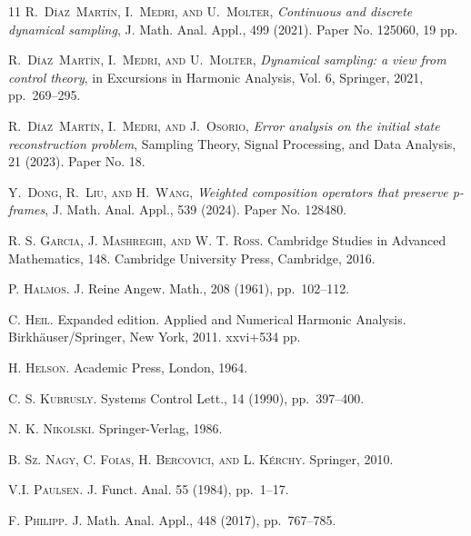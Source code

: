 \documentclass[a4paper,12pt]{amsart}
\theoremstyle{definition}
\begin{document}
\begin{thebibliography}{11}
\textsc{R.~D\'iaz~Mart\'{\i}n, I.~Medri, and U.~Molter}, {\em Continuous and discrete dynamical sampling}, J. Math. Anal. Appl., 499 (2021).
\newblock Paper No. 125060, 19 pp.

\textsc{R.~D\'iaz~Mart\'in, I.~Medri, and U.~Molter}, {\em Dynamical sampling: a view from control theory}, in Excursions in Harmonic Analysis, Vol. 6, Springer, 2021, pp.~269–295.

\textsc{R.~D\'iaz~Mart\'in, I.~Medri, and J.~Osorio}, {\em Error analysis on the initial state reconstruction problem}, Sampling Theory, Signal Processing, and Data Analysis, 21 (2023).
\newblock Paper No. 18.

   \textsc{Y.~Dong, R.~Liu, and H.~Wang}, {\em Weighted composition operators that preserve p-frames}, J. Math. Anal. Appl., 539 (2024).
\newblock Paper No. 128480.


\textsc{R. S. Garcia, J. Mashreghi, and W. T. Ross.} 
Cambridge Studies in Advanced Mathematics, 148. Cambridge University Press, Cambridge,
2016.

\textsc{P. Halmos.}
J. Reine Angew. Math., 208 (1961), pp.~102--112.

\textsc{C. Heil.}
Expanded edition. Applied and Numerical Harmonic Analysis. Birkhäuser/Springer, New York, 2011. xxvi+534 pp.

\textsc{H. Helson.}
Academic Press, London, 1964.

\textsc{C. S. Kubrusly.}
Systems Control Lett., 14 (1990), pp.~397--400.

\textsc{N. K. Nikolski.}
Springer-Verlag, 1986.

\textsc{B. Sz. Nagy, C. Foias, H. Bercovici, and L. K\'erchy.}
Springer, 2010.

\textsc{V.I. Paulsen.}
J. Funct. Anal. 55 (1984), pp.~1--17.

\textsc{F. Philipp.}
J. Math. Anal. Appl., 448 (2017), pp.~767--785.


\end{thebibliography}
\end{document}
